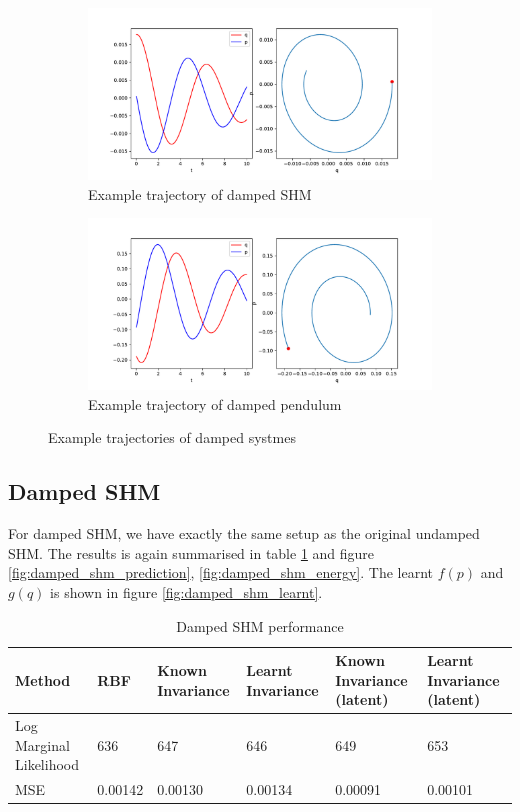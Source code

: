 \documentclass{statsmsc}
\begin{document}
\begin{figure}[H]
     \centering
     \begin{subfigure}[b]{\linewidth}
        \centering
        \includegraphics[width=0.5\linewidth]{../codes/figures/damped_shm_trajectory_1D.pdf}
        \caption{Example trajectory of damped SHM}
        \label{fig:damped_shm_trajectory}
     \end{subfigure}
     \hfill
     \begin{subfigure}[b]{\linewidth}
        \centering
        \includegraphics[width=0.5\linewidth]{../codes/figures/damped_pendulum_trajectory_1D.pdf}
        \caption{Example trajectory of damped pendulum}
        \label{fig:damped_pendulum_trajectory}
     \end{subfigure}
        \caption{Example trajectories of damped systmes}
        \label{fig:damped_trajectory}
\end{figure}

\subsection{Damped SHM}
For damped SHM, we have exactly the same setup as the original undamped SHM.
The results is again summarised in table \ref{tab:damped_shm_performance} and figure \ref{fig:damped_shm_prediction}, \ref{fig:damped_shm_energy}.
The learnt $f(p)$ and $g(q)$ is shown in figure \ref{fig:damped_shm_learnt}.

\begin{table}[H]
  \centering
  \begin{tabular}{l l l l l l}
    \hline
Method           & RBF & Known Invariance&  Learnt Invariance & Known Invariance (latent) & Learnt Invariance (latent)\\
  \hline
Log Marginal Likelihood & 636 & 647 & 646 & 649 & 653 \\
MSE & 0.00142 & 0.00130 & 0.00134 & 0.00091 & 0.00101 \\
    \hline
  \end{tabular}
  \caption{Damped SHM performance}
  \label{tab:damped_shm_performance}
\end{table}
\end{document}
